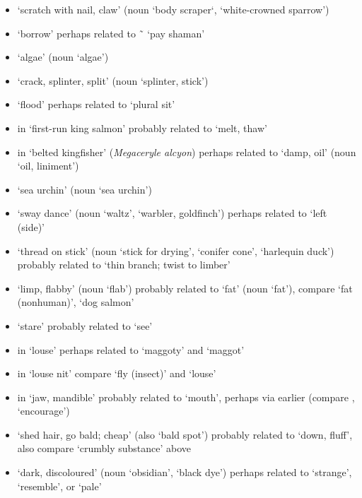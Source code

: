 \begin{morphdesc}[resume*=alphalist]
\begin{enumerate}
\begin{itemize}
			(noun  ‘cloud’)
			perhaps related to  ‘poke, stab’ or  ‘base’
		\item	{} ‘scratch with nail, claw’
			(noun  ‘body scraper‘,
			 ‘white-crowned sparrow’)
		\item	{} ‘borrow’
			perhaps related to  \~\  ‘pay shaman’
		\item	{} ‘algae’
			(noun  ‘algae’)
		\item	{} ‘crack, splinter, split’
			(noun  ‘splinter, stick’)
		\item	{} ‘flood’
			perhaps related to  ‘plural sit’
		\item	{} in  ‘first-run king salmon’
			probably related to  ‘melt, thaw’
		\item	{} in  ‘belted kingfisher’
			(\textit{Megaceryle alcyon})
			perhaps related to  ‘damp, oil’
			(noun  ‘oil, liniment’)
		\item	{} ‘sea urchin’
			(noun  ‘sea urchin’)
		\item	{} ‘sway dance’
			(noun  ‘waltz’,  ‘warbler, goldfinch’)
			perhaps related to  ‘left (side)’
		\item	{} ‘thread on stick’
			(noun  ‘stick for drying’,  ‘conifer cone’,
				 ‘harlequin duck’)
			probably related to  ‘thin branch; twist to limber’
		\item	{} ‘limp, flabby’
			(noun  ‘flab’)
			probably related to  ‘fat’ (noun  ‘fat’),
			compare  ‘fat (nonhuman)’,
			 ‘dog salmon’
		\item	{} ‘stare’
			probably related to  ‘see’
		\item	{} in  ‘louse’
			perhaps related to  ‘maggoty’
			and  ‘maggot’
		\item	{} in  ‘louse nit’
			compare  ‘fly (insect)’ and  ‘louse’
		\item	{} in  ‘jaw, mandible’
			probably related to  ‘mouth’,
			perhaps via earlier 
			(compare ,  ‘encourage’)
		\item	{} ‘shed hair, go bald; cheap’
			(also  ‘bald spot’)
			probably related to  ‘down, fluff’,
			also compare  ‘crumbly substance’ above
		\item	{} ‘dark, discoloured’
			(noun  ‘obsidian’,  ‘black dye’)
			perhaps related to  ‘strange’,
			 ‘resemble’,
			or  ‘pale’
		\end{itemize}
	\end{enumerate}



\end{morphdesc}
